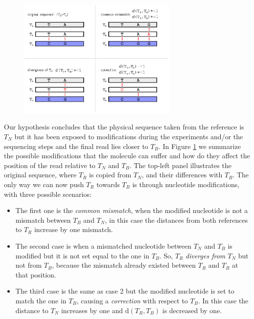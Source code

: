 \begin{figure}[h]
	\begin{minipage}[b]{\linewidth}
	  \centering
	  \includegraphics[width=0.7\textwidth]{figures/chap3_neigh_mutations}
	  \caption{}
	  \label{fig:chap3:mutations}
   \end{minipage}
\end{figure}

Our hypothesis concludes that the physical sequence taken from the
reference is $T_N$ but it has been exposed to modifications during the
experiments and/or the sequencing steps and the final read lies closer
to $T_B$. In Figure \ref{fig:chap3:mutations} we summarize the
possible modifications that the molecule can suffer and how do they
affect the position of the read relative to $T_N$ and $T_B$. The
top-left panel illustrates the original sequence, where $T_R$ is
copied from $T_N$, and their differences with $T_B$. The only way we
can now push $T_R$ towards $T_B$ is through nucleotide modifications,
with three possible scenarios: 
\begin{itemize}
\item The first one is the {\em common mismatch}, when the modified
  nucleotide is not a mismatch between $T_B$ and $T_N$, in this case
  the distances from both references to $T_R$ increase by one
  mismatch. 
\item The second case is when a mismatched nucleotide between $T_N$
  and $T_B$ is modified but it is not set equal to the one in
  $T_B$. So, $T_R$ {\em diverges from $T_N$} but not from $T_B$,
  because the mismatch already existed between $T_R$ and $T_B$ at that
  position.
\item The third case is the same as case 2 but the modified nucleotide
  is set to match the one in $T_B$, causing a {\em correction} with
  respect to $T_B$. In this case the distance to $T_N$ increases by
  one and $\mathrm{d}(T_R,T_B)$ is decreased by one.
\end{itemize}


